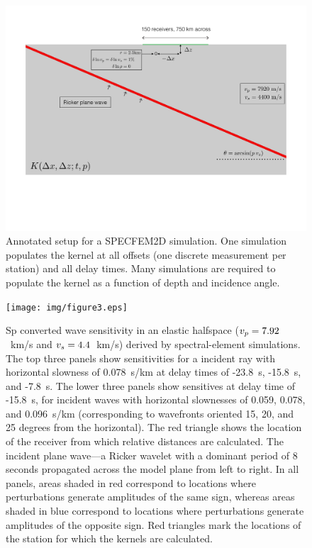 \documentclass[referee]{gji}
\begin{document}
\begin{figure}
\centering
\includegraphics[scale=0.5]{img/Figure2.pdf}
\caption{Annotated setup for a SPECFEM2D simulation.  One simulation populates the kernel at all offsets (one discrete measurement per station) and all delay times.  Many simulations are required to populate the kernel as a function of depth and incidence angle.}
\label{fig:ModelSetup}
\end{figure}

\begin{figure}
\centering
\texttt{[image: img/figure3.eps]}
\caption{Sp converted wave sensitivity in an elastic halfspace ($v_p=7.92$~km/s and $v_s=4.4$~km/s) derived by spectral-element simulations.  The top three panels show sensitivities for a incident ray with horizontal slowness of 0.078~s/km at delay times of -23.8~s, -15.8~s, and -7.8~s. The lower three panels show sensitives at delay time of -15.8~s, for incident waves with horizontal slownesses of 0.059, 0.078, and 0.096~s/km (corresponding to wavefronts oriented 15, 20, and 25 degrees from the horizontal).  The red triangle shows the location of the receiver from which relative distances are calculated.  The incident plane wave---a Ricker wavelet with a dominant period of 8 seconds propagated across the model plane from left to right.  In all panels, areas shaded in red correspond to locations where perturbations generate amplitudes of the same sign, whereas areas shaded in blue correspond to locations where perturbations generate amplitudes of the opposite sign.  Red triangles mark the locations of the station for which the kernels are calculated.}
\label{fig:KernelsTime}
\end{figure}
\end{document}
